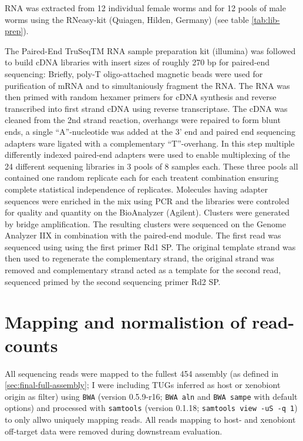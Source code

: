 RNA was extracted from 12 individual female worms and for 12 pools of
male worms using the RNeasy-kit (Quiagen, Hilden, Germany) (see table
\ref{tab:lib-prep}).

The Paired-End TruSeqTM RNA sample preparation kit (illumina) was
followed to build cDNA libraries with insert sizes of roughly 270 bp
for paired-end sequencing: Briefly, poly-T oligo-attached magnetic
beads were used for purification of mRNA and to simultaniously
fragment the RNA. The RNA was then primed with random hexamer primers
for cDNA synthesis and reverse transcribed into first strand cDNA
using reverse transcriptase. The cDNA was cleaned from the 2nd strand
reaction, overhangs were repaired to form blunt ends, a single
``A''-nucleotide was added at the 3' end and paired end sequencing
adapters ware ligated with a complementary ``T''-overhang. In this
step multiple differently indexed paired-end adapters were used to
enable multiplexing of the 24 different sequening libraries in 3 pools
of 8 samples each. These three pools all contained one random
replicate each for each treatent combination ensuring complete
statistical independence of replicates. Molecules having adapter
sequences were enriched in the mix using PCR and the libraries were
controled for quality and quantity on the BioAnalyzer
(Agilent). Clusters were generated by bridge amplification. The
resulting clusters were sequenced on the Genome Analyzer IIX in
combination with the paired-end module. The first read was sequenced
using using the first primer Rd1 SP. The original template strand was
then used to regenerate the complementary strand, the original strand
was removed and complementary strand acted as a template for the
second read, sequenced primed by the second sequencing primer Rd2 SP.

\section{Mapping and normalistion of read-counts}

All sequencing reads were mapped to the fullest 454 assembly (as
defined in \ref{sec:final-full-assembly}; I were including TUGs
inferred as host or xenobiont origin as filter) using \texttt{BWA}
\cite{pmid20080505} (version 0.5.9-r16; \texttt{BWA aln} and
\texttt{BWA sampe} with default options) and processed with
\texttt{samtools} \cite{journals/bioinformatics/LiHWFRHMAD09} (version
0.1.18; \texttt{samtools view -uS -q 1}) to only allwo uniquely
mapping reads. All reads mapping to host- and xenobiont off-target
data were removed during downstream evaluation.

